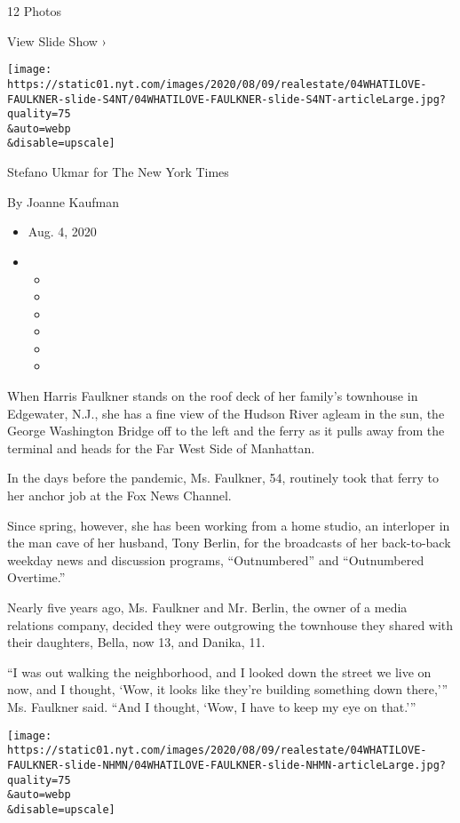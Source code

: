 12 Photos

View Slide Show ›

\texttt{[image: https://static01.nyt.com/images/2020/08/09/realestate/04WHATILOVE-FAULKNER-slide-S4NT/04WHATILOVE-FAULKNER-slide-S4NT-articleLarge.jpg?quality=75\\\&auto=webp\\\&disable=upscale]}

Stefano Ukmar for The New York Times

By Joanne Kaufman

\begin{itemize}
\item
  Aug. 4, 2020
\item
  \begin{itemize}
  \item
  \item
  \item
  \item
  \item
  \item
  \end{itemize}
\end{itemize}

When Harris Faulkner stands on the roof deck of her family's townhouse
in Edgewater, N.J., she has a fine view of the Hudson River agleam in
the sun, the George Washington Bridge off to the left and the ferry as
it pulls away from the terminal and heads for the Far West Side of
Manhattan.

In the days before the pandemic, Ms. Faulkner, 54, routinely took that
ferry to her anchor job at the Fox News Channel.

Since spring, however, she has been working from a home studio, an
interloper in the man cave of her husband, Tony Berlin, for the
broadcasts of her back-to-back weekday news and discussion programs,
``Outnumbered'' and ``Outnumbered Overtime.''

Nearly five years ago, Ms. Faulkner and Mr. Berlin, the owner of a media
relations company, decided they were outgrowing the townhouse they
shared with their daughters, Bella, now 13, and Danika, 11.

``I was out walking the neighborhood, and I looked down the street we
live on now, and I thought, `Wow, it looks like they're building
something down there,''' Ms. Faulkner said. ``And I thought, `Wow, I
have to keep my eye on that.'''

\texttt{[image: https://static01.nyt.com/images/2020/08/09/realestate/04WHATILOVE-FAULKNER-slide-NHMN/04WHATILOVE-FAULKNER-slide-NHMN-articleLarge.jpg?quality=75\\\&auto=webp\\\&disable=upscale]}

